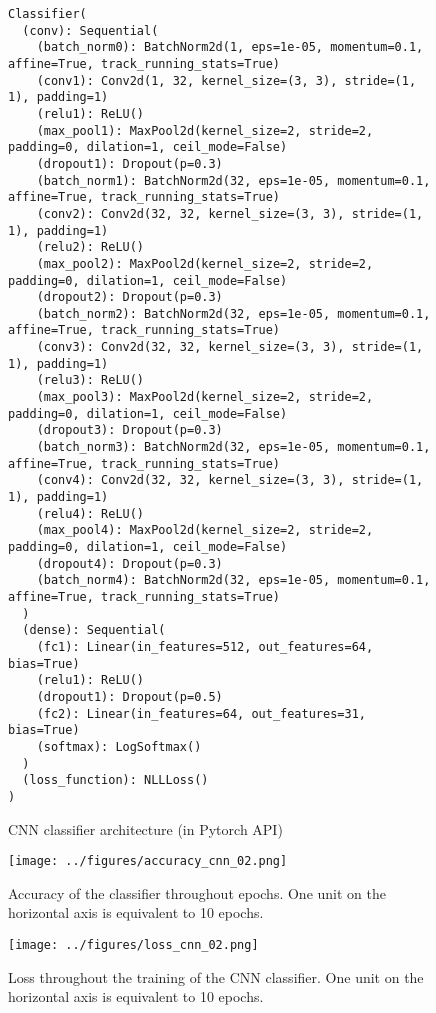 \documentclass[12pt,english]{article}
\begin{document}
\begin{figure}
\begin{verbatim}
Classifier(
  (conv): Sequential(
    (batch_norm0): BatchNorm2d(1, eps=1e-05, momentum=0.1, affine=True, track_running_stats=True)
    (conv1): Conv2d(1, 32, kernel_size=(3, 3), stride=(1, 1), padding=1)
    (relu1): ReLU()
    (max_pool1): MaxPool2d(kernel_size=2, stride=2, padding=0, dilation=1, ceil_mode=False)
    (dropout1): Dropout(p=0.3)
    (batch_norm1): BatchNorm2d(32, eps=1e-05, momentum=0.1, affine=True, track_running_stats=True)
    (conv2): Conv2d(32, 32, kernel_size=(3, 3), stride=(1, 1), padding=1)
    (relu2): ReLU()
    (max_pool2): MaxPool2d(kernel_size=2, stride=2, padding=0, dilation=1, ceil_mode=False)
    (dropout2): Dropout(p=0.3)
    (batch_norm2): BatchNorm2d(32, eps=1e-05, momentum=0.1, affine=True, track_running_stats=True)
    (conv3): Conv2d(32, 32, kernel_size=(3, 3), stride=(1, 1), padding=1)
    (relu3): ReLU()
    (max_pool3): MaxPool2d(kernel_size=2, stride=2, padding=0, dilation=1, ceil_mode=False)
    (dropout3): Dropout(p=0.3)
    (batch_norm3): BatchNorm2d(32, eps=1e-05, momentum=0.1, affine=True, track_running_stats=True)
    (conv4): Conv2d(32, 32, kernel_size=(3, 3), stride=(1, 1), padding=1)
    (relu4): ReLU()
    (max_pool4): MaxPool2d(kernel_size=2, stride=2, padding=0, dilation=1, ceil_mode=False)
    (dropout4): Dropout(p=0.3)
    (batch_norm4): BatchNorm2d(32, eps=1e-05, momentum=0.1, affine=True, track_running_stats=True)
  )
  (dense): Sequential(
    (fc1): Linear(in_features=512, out_features=64, bias=True)
    (relu1): ReLU()
    (dropout1): Dropout(p=0.5)
    (fc2): Linear(in_features=64, out_features=31, bias=True)
    (softmax): LogSoftmax()
  )
  (loss_function): NLLLoss()
)
\end{verbatim}
	\caption{CNN classifier architecture (in Pytorch API)}
	\label{fig:cnn}
\end{figure}

\begin{figure}
	\centering
	\texttt{[image: ../figures/accuracy\_cnn\_02.png]}
	\caption{Accuracy of the classifier throughout epochs. One unit on the horizontal axis is equivalent to 10 epochs.}
	\label{fig:acc}
\end{figure}

\begin{figure}
	\centering
	\texttt{[image: ../figures/loss\_cnn\_02.png]}
	\caption{Loss throughout the training of the CNN classifier. One unit on the horizontal axis is equivalent to 10 epochs.}
	\label{fig:loss}
\end{figure}
\end{document}
